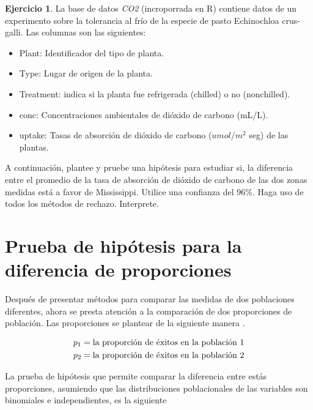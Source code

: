 \documentclass[
  11pt,
]{book}
\providecommand{\tightlist}{%
  \setlength{\itemsep}{0pt}\setlength{\parskip}{0pt}}
\theoremstyle{definition}
\theoremstyle{definition}
\theoremstyle{definition}
\newtheorem{exercise}{Ejercicio}[chapter]
\theoremstyle{definition}
\theoremstyle{remark}
\begin{document}
\begin{exercise}
La base de datos \emph{CO2} (incroporrada en R) contiene datos de un experimento sobre la tolerancia al frío de la especie de pasto Echinochloa crus-galli. Las columnas son las siguientes:

\begin{itemize}
\tightlist
\item
  Plant: Identificador del tipo de planta.
\item
  Type: Lugar de origen de la planta.
\item
  Treatment: indica si la planta fue refrigerada (chilled) o no (nonchilled).
\item
  conc: Concentraciones ambientales de dióxido de carbono (mL/L).
\item
  uptake: Tasas de absorción de dióxido de carbono (\(umol/m^2\) seg) de las plantas.
\end{itemize}

A continuación, plantee y pruebe una hipótesis para estudiar si, la diferencia entre el promedio de la tasa de absorción de dióxido de carbono de las dos zonas medidas está a favor de Mississippi. Utilice una confianza del 96\%. Haga uso de todos los métodos de rechazo. Interprete.
\end{exercise}

\section{Prueba de hipótesis para la diferencia de proporciones}\label{prueba-de-hipuxf3tesis-para-la-diferencia-de-proporciones}

Después de presentar métodos para comparar las medidas de dos poblaciones diferentes, ahora se presta atención a la comparación de dos proporciones de población. Las proporciones se plantear de la siguiente manera \citep[página 353]{Devore}.

\begin{equation}
\notag
\begin{split}
p_1 &= \text{la proporción de éxitos en la población 1}\\
p_2 &= \text{la proporción de éxitos en la población 2}\\
\end{split}
\end{equation}

La prueba de hipótesis que permite comparar la diferencia entre estás proporciones, asumiendo que las distribuciones poblacionales de las variables son binomiales e independientes, es la siguiente
\end{document}
